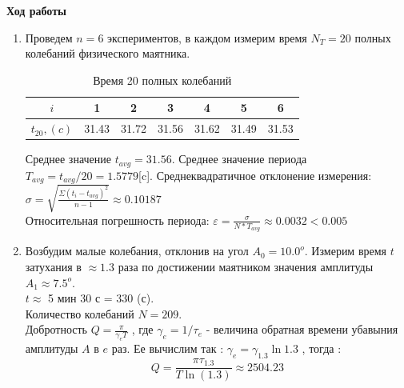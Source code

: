 \documentclass[12pt]{article}
\begin{document}
    \textbf{Ход работы}
    \begin{enumerate} 
        \item Проведем $n = 6$ экспериментов, в каждом измерим время $N_T = 20$ полных колебаний физического маятника.
            \begin{table}[h]
                    \caption{Время 20 полных колебаний}
                    \begin{center}
                    \begin{tabular}{|c|c|c|c|c|c|c|}
                            \hline 
                                $i$ & 1 & 2 & 3 & 4 & 5 & 6 \\
                            \hline
                                $t_{20} , (c)$ &31.43&31.72&31.56&31.62&31.49&31.53\\
                            \hline
                            \end{tabular}
                        \end{center}
            \end{table}

            Среднее значение $t_{avg} = 31.56$. Среднее значение периода $T_{avg} = t_{avg}/20 = 1.5779$[c].
            Среднеквадратичное отклонение измерения:
            $\sigma = \sqrt{\frac{\Sigma (t_i - t_{avg})^2 }{n-1}} \approx 0.10187$ \\
            Относительная погрешность периода: $\varepsilon = \frac{\sigma}{N* T_{avg}} \approx 0.0032 < 0.005$ \\  

        \item Возбудим малые колебания, отклонив на угол $A_0 = 10.0^o$. Измерим время $t$ затухания в $\approx 1.3$ раза по достижении маятником значения амплитуды $A_1 \approx 7.5^o$. \\
        $t \approx$ 5 мин 30 с = 330 (с). \\
        Количество колебаний $N = 209$.\\
        Добротность $Q = \frac{\pi}{\gamma_{e}T}$ , где $\gamma_{e} = 1 / \tau_{e}$ - величина обратная времени убавыния амплитуды $A$ в $e$ раз. Ее вычислим так : $\gamma_{e} = \gamma_{1.3} \ln{1.3}$ , тогда :\\
        \begin{equation}
            Q = \frac{\pi \tau_{1.3}}{T \ln(1.3)} \approx 2504.23
        \end{equation}

    \end{enumerate}
\end{document}
